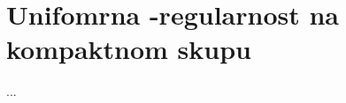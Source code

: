 \documentclass[main.tex]{subfiles}
\begin{document}
\nocite{*}

\section{Unifomrna \holder -regularnost na kompaktnom skupu}\label{sec:holunif}
...
\end{document}
